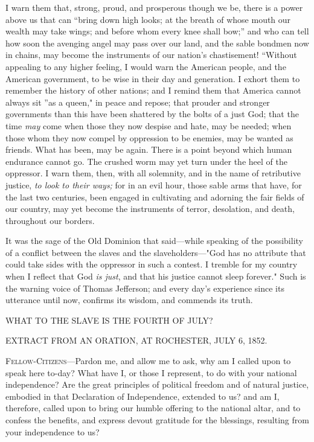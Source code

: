 I warn them that, strong, proud, and prosperous though we be, there is a
power above us that can ``bring down high looks; at the breath of whose
mouth our wealth may take wings; and before whom every knee shall bow;''
and who can tell how soon the avenging angel may pass over our land, and
the sable bondmen now in chains, may become the instruments of our
nation's chastisement! ``Without appealing to any higher feeling, I
would warn the American people, and the American government, to be wise
in their day and generation. I exhort them to remember the history of
other nations; and I remind them that America cannot always sit ''as a
queen," in peace and repose; that prouder and stronger governments than
this have been shattered by the bolts of a just God; that the time
\emph{may} come when those they now despise and hate, may be needed;
when those whom they now compel by oppression to be enemies, may be
wanted as friends. What has been, may be again. There is a point beyond
which human endurance cannot go. The crushed worm may yet turn under the
heel of the oppressor. I warn them, then, with all solemnity, and in the
name of retributive justice, \emph{to look to their ways;} for in an
evil hour, those sable arms that have, for the last two centuries, been
engaged in cultivating and adorning the fair fields of our country, may
yet become the instruments of terror, desolation, and death, throughout
our borders.

It was the sage of the Old Dominion that said---while speaking of the
possibility of a conflict between the slaves and the slaveholders---"God
has no attribute that could take sides with the oppressor in such a
contest. I tremble for my country when I reflect that God \emph{is
just}, and that his justice cannot sleep forever." Such is the warning
voice of Thomas Jefferson; and every day's experience since its
utterance until now, confirms its wisdom, and commends its truth.

{\protect\hypertarget{ux5cux7bux5cux7bux5cux7b1ux5cux7dux5cux7dux5cux7d}{}{}}

{\protect\hypertarget{441}{}{}}

{WHAT TO THE SLAVE IS THE FOURTH OF JULY?}

{EXTRACT FROM AN ORATION, AT ROCHESTER, JULY 6, 1852.}

\textsc{Fellow-Citizens}---Pardon me, and allow me to ask, why am I
called upon to speak here to-day? What have I, or those I represent, to
do with your national independence? Are the great principles of
political freedom and of natural justice, embodied in that Declaration
of Independence, extended to us? and am I, therefore, called upon to
bring our humble offering to the national altar, and to confess the
benefits, and express devout gratitude for the blessings, resulting from
your independence to us?

